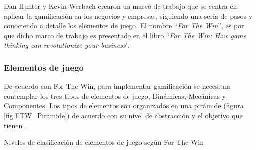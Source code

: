  Dan Hunter y Kevin Werbach crearon un marco de trabajo que se centra en aplicar la gamificación en
 los negocios y empresas, siguiendo una sería de pasos y conociendo a detalle los elementos de juego.
 El nombre ``{\it For The Win}'', es por que dicho marco de trabajo es presentado en el libro
 ``{\it For The Win:  How game thinking can revolutionize your business}''.
    
\subsubsection{Elementos de juego}
    
 \noindent De acuerdo con For The Win, para implementar gamificación se necesitan contemplar
 los tres tipos de elementos de juego, Dinámicas, Mecánicas y Componentes. Los tipos de
 elementos son organizados en una pirámide (figura \ref{fig:FTW_Piramide}) de acuerdo con
 su nivel de abstracción y el objetivo que tienen \cite[pp. 55-57]{FrameWorkForTheWin}.
    
        {Niveles de clasificación de elementos de juego según For The Win}
    
